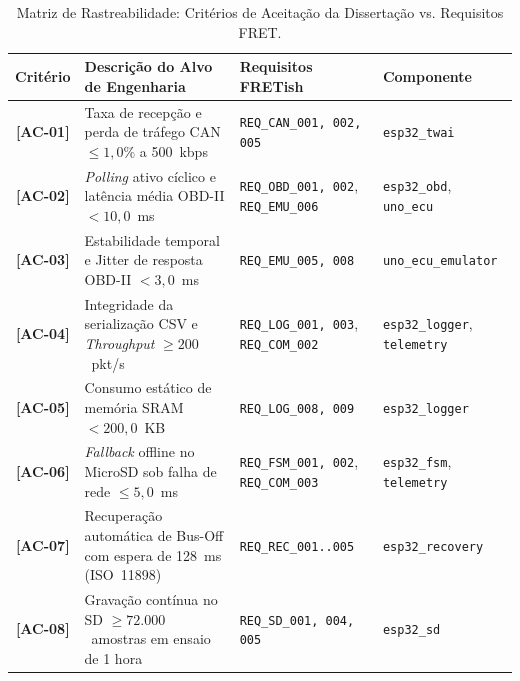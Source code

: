 \begin{table}[htbp]
\centering
\footnotesize
\caption{Matriz de Rastreabilidade: Critérios de Aceitação da Dissertação vs. Requisitos FRET.}
\label{tab:rastreabilidade_ac}
\setlength{\tabcolsep}{3pt}
\renewcommand{\arraystretch}{1.25}
\begin{tabular}{@{} c >{\raggedright\arraybackslash}p{6.2cm} >{\raggedright\arraybackslash}p{4.2cm} >{\raggedright\arraybackslash}p{3.4cm} @{}}
\toprule
\textbf{Critério} & \textbf{Descrição do Alvo de Engenharia} & \textbf{Requisitos FRETish} & \textbf{Componente} \\
\midrule
\textbf{[AC-01]} & Taxa de recepção e perda de tráfego CAN $\le 1{,}0\%$ a 500~kbps & \texttt{REQ\_CAN\_001, 002, 005} & \texttt{esp32\_twai} \\
\textbf{[AC-02]} & \textit{Polling} ativo cíclico e latência média OBD-II $< 10{,}0$~ms & \texttt{REQ\_OBD\_001, 002}, \newline \texttt{REQ\_EMU\_006} & \texttt{esp32\_obd}, \newline \texttt{uno\_ecu} \\
\textbf{[AC-03]} & Estabilidade temporal e Jitter de resposta OBD-II $< 3{,}0$~ms & \texttt{REQ\_EMU\_005, 008} & \texttt{uno\_ecu\_}\allowbreak\texttt{emulator} \\
\textbf{[AC-04]} & Integridade da serialização CSV e \textit{Throughput} $\ge 200$~pkt/s & \texttt{REQ\_LOG\_001, 003}, \newline \texttt{REQ\_COM\_002} & \texttt{esp32\_logger}, \newline \texttt{telemetry} \\
\textbf{[AC-05]} & Consumo estático de memória SRAM $< 200{,}0$~KB & \texttt{REQ\_LOG\_008, 009} & \texttt{esp32\_logger} \\
\textbf{[AC-06]} & \textit{Fallback} offline no MicroSD sob falha de rede $\le 5{,}0$~ms & \texttt{REQ\_FSM\_001, 002}, \newline \texttt{REQ\_COM\_003} & \texttt{esp32\_fsm}, \newline \texttt{telemetry} \\
\textbf{[AC-07]} & Recuperação automática de Bus-Off com espera de 128~ms (ISO~11898) & \texttt{REQ\_REC\_001..005} & \texttt{esp32\_recovery} \\
\textbf{[AC-08]} & Gravação contínua no SD $\ge 72.000$~amostras em ensaio de 1 hora & \texttt{REQ\_SD\_001, 004, 005} & \texttt{esp32\_sd} \\
\bottomrule
\end{tabular}
\end{table}
